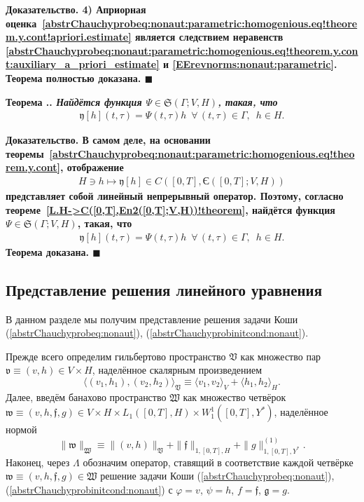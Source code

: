 \documentclass{report}
\newcounter{rem}[section]
\newcounter{theor}[section]
\renewcommand{\thetheor}{\thesection.\arabic{theor}}
\newenvironment{Theorem}{\par\refstepcounter{theor}\bf Теорема \thetheor. \it}{\rm\par}
\newenvironment{Proof}{\par\noindent\bf Доказательство.\rm}{ $\blacksquare$\par}
\begin{document}
\begin{Proof}
4) Априорная оценка~\eqref{abstrChauchyprobeq:nonaut:parametric:homogenious.eq!theorem.y.cont!apriori.estimate} является следствием неравенств 
\eqref{abstrChauchyprobeq:nonaut:parametric:homogenious.eq!theorem.y.cont:auxiliary_a_priori_estimate} и \eqref{EErevnorms:nonaut:parametric}. Теорема полностью доказана.
\end{Proof}

\begin{Theorem}\label{abstrChauchyprobeq:nonaut:parametric:homogenious.eq!theorem.y.representation}
Найдётся функция $\Psi\in\mathfrak{S}(\Gamma;V,H)$, такая, что
\begin{gather*}
\mathfrak{y}[h](t,\tau)=\Psi(t,\tau)h\,\,\,\forall\,(t,\tau)\in\Gamma,\,\,\,h\in H.
\end{gather*}
\end{Theorem}
\begin{Proof}
В самом деле, на основании теоремы~\ref{abstrChauchyprobeq:nonaut:parametric:homogenious.eq!theorem.y.cont}, отображение
\begin{gather*}
H\ni h\mapsto \mathfrak{y}[h]\in C([0,T],{\textrm{Є}}([0,T];V,H))
\end{gather*}
представляет собой линейный непрерывный оператор. Поэтому, согласно теореме~\ref{L.H->C([0,T],En2([0,T];V,H))!theorem}, найдётся функция $\Psi\in\mathfrak{S}(\Gamma;V,H)$, такая, что
\begin{gather*}
\mathfrak{y}[h](t,\tau)=\Psi(t,\tau)h\,\,\,\forall\,(t,\tau)\in\Gamma,\,\,\,h\in H.
\end{gather*}
Теорема доказана.
\end{Proof}


	    \subsection{Представление решения линейного уравнения} 
В данном разделе мы получим представление решения задачи Коши (\ref{abstrChauchyprobeq:nonaut}), (\ref{abstrChauchyprobinitcond:nonaut}). 

Прежде всего определим гильбертово пространство $\mathfrak{V}$ как множество пар $\mathfrak{v}\equiv(v,h)\in V\times H$, наделённое скалярным произведением 
$$
\langle(v_1,h_1),(v_2,h_2)\rangle_{\mathfrak{V}}\equiv\langle v_1,v_2\rangle_V+\langle h_1,h_2\rangle_H.
$$
Далее, введём банахово пространство $\mathfrak{W}$ как множество четвёрок $\mathfrak{w}\equiv(v,h,\mathfrak{f},{g})\in V\times H\times  L_1([0,T],H)\times W^1_1([0,T], Y^*)$,
 наделённое нормой
$$
\|\mathfrak{w}\|_{\mathfrak{W}}\equiv\|(v,h)\|_{\mathfrak{V}}+\|\mathfrak{f}\|_{1,[0,T],H}+\|{g}\|^{(1)}_{1,[0,T],Y^*}.
$$
Наконец, через $\Lambda$ обозначим оператор, ставящий в соответствие каждой четвёрке $\mathfrak{w}\equiv(v,h,\mathfrak{f},{g})\in\mathfrak{W}$ решение задачи Коши (\ref{abstrChauchyprobeq:nonaut}), (\ref{abstrChauchyprobinitcond:nonaut}) с $\varphi=v$, $\psi=h$, $f=\mathfrak{f}$, $\mathfrak{g}=g$.
\end{document}
